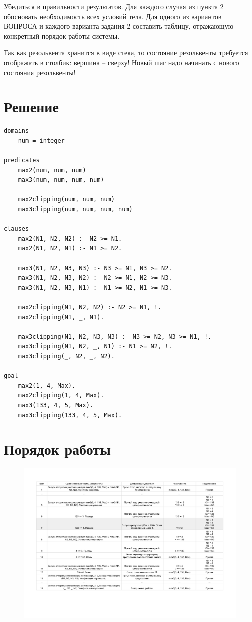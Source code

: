 \documentclass[12pt]{report}
\begin{document}
Убедиться в правильности результатов. Для каждого случая из пункта 2 обосновать необходимость всех условий тела. Для одного из вариантов ВОПРОСА и каждого варианта задания 2 составить таблицу, отражающую конкретный порядок работы системы.

Так как резольвента хранится в виде стека, то состояние резольвенты требуется отображать в столбик: вершина – сверху! Новый шаг надо начинать с нового состояния резольвенты!


\newpage
\section*{Решение}

\begin{lstlisting}
domains
	num = integer

predicates
	max2(num, num, num)
	max3(num, num, num, num)
	
	max2clipping(num, num, num)
	max3clipping(num, num, num, num)

clauses
	max2(N1, N2, N2) :- N2 >= N1.
	max2(N1, N2, N1) :- N1 >= N2.
	
	max3(N1, N2, N3, N3) :- N3 >= N1, N3 >= N2.
	max3(N1, N2, N3, N2) :- N2 >= N1, N2 >= N3.
	max3(N1, N2, N3, N1) :- N1 >= N2, N1 >= N3.
	
	max2clipping(N1, N2, N2) :- N2 >= N1, !.
	max2clipping(N1, _, N1).
	
	max3clipping(N1, N2, N3, N3) :- N3 >= N2, N3 >= N1, !.
	max3clipping(N1, N2, _, N1) :- N1 >= N2, !.
	max3clipping(_, N2, _, N2).

goal
	max2(1, 4, Max).
	max2clipping(1, 4, Max).
	max3(133, 4, 5, Max).
	max3clipping(133, 4, 5, Max).
\end{lstlisting}

\section*{Порядок работы}

\begin{figure}[H]
	\begin{center}
		\includegraphics[scale=0.7]{imgs/table_15_01.pdf}
	\end{center}
\end{figure}
\end{document}
